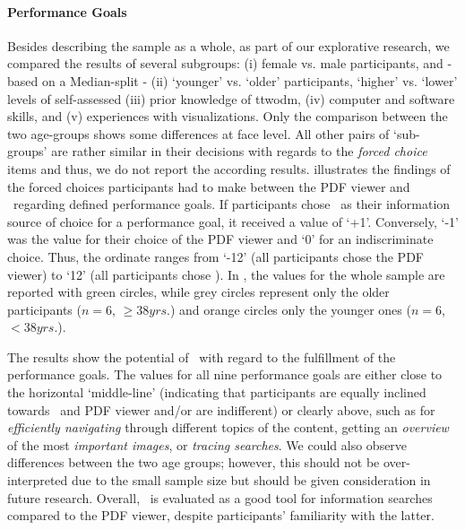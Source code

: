 \paragraph*{Performance Goals}
%
Besides describing the sample as a whole, as part of our explorative research, we compared the results of several subgroups: 
(i) female vs. male participants, and - based on a Median-split - 
(ii) `younger' vs. `older' participants, `higher' vs. `lower' levels of self-assessed 
(iii) prior knowledge of \acrshort{ttwodm}, 
(iv) computer and software skills, and 
(v) experiences with visualizations. 
%
Only the comparison between the two age-groups shows some differences at face level. 
%
All other pairs of `sub-groups' are rather similar in their decisions with regards to the \emph{forced choice} items and thus, we do not report the according results.
%
 illustrates the findings of the forced choices participants had to make between the PDF viewer and \apluschis\ regarding defined performance goals. 
%
If participants chose \apluschis\ as their information source of choice for a performance goal, it received a value of `+1'. 
%
Conversely, `-1' was the value for their choice of the PDF viewer and `0' for an indiscriminate choice. 
%
Thus, the ordinate ranges from `-12' (all participants chose the PDF viewer) to `12' (all participants chose \apluschis). 
%
In , the values for the whole sample are reported with green circles, while grey circles represent only the older participants ($n = 6$, $\geq 38 \unit{yrs.}$) and orange circles only the younger ones ($n = 6$, $< 38 \unit{yrs.}$).



The results show the potential of \apluschis\ with regard to the fulfillment of the performance goals. 
%
The values for all nine performance goals are either close to the horizontal `middle-line' (indicating that participants are equally inclined towards \apluschis\ and PDF viewer and/or are indifferent) or clearly above, such as for \emph{efficiently navigating} through different topics of the content, getting an \emph{overview} of the most \emph{important images}, or \emph{tracing searches}. 
%
We could also observe differences between the two age groups; however, this should not be over-interpreted due to the small sample size but should be given consideration in future research. 
%
Overall, \apluschis\ is evaluated as a good tool for information searches compared to the PDF viewer, despite participants' familiarity with the latter.

